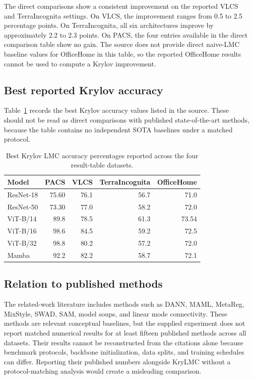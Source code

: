 \documentclass[11pt,a4paper]{article}
\begin{document}
The direct comparisons show a consistent improvement on the reported VLCS and TerraIncognita settings. On VLCS, the improvement ranges from 0.5 to 2.5 percentage points. On TerraIncognita, all six architectures improve by approximately 2.2 to 2.3 points. On PACS, the four entries available in the direct comparison table show no gain. The source does not provide direct naive-LMC baseline values for OfficeHome in this table, so the reported OfficeHome results cannot be used to compute a Krylov improvement.

\subsection{Best reported Krylov accuracy}
Table~\ref{tab:best_accuracy} records the best Krylov accuracy values listed in the source. These should not be read as direct comparisons with published state-of-the-art methods, because the table contains no independent SOTA baselines under a matched protocol.

\begin{table}[H]
\centering
\caption{Best Krylov LMC accuracy percentages reported across the four result-table datasets.}
\label{tab:best_accuracy}
\small
\begin{tabular}{lrrrr}
\toprule
Model & PACS & VLCS & TerraIncognita & OfficeHome \\
\midrule
ResNet-18 & 75.60 & 76.1 & 56.7 & 71.0 \\
ResNet-50 & 73.30 & 77.0 & 58.2 & 72.0 \\
ViT-B/14 & 89.8 & 78.5 & 61.3 & 73.54 \\
ViT-B/16 & 98.6 & 84.5 & 59.2 & 72.5 \\
ViT-B/32 & 98.8 & 80.2 & 57.2 & 72.0 \\
Mamba & 92.2 & 82.2 & 58.7 & 72.1 \\
\bottomrule
\end{tabular}
\end{table}

\subsection{Relation to published methods}
The related-work literature includes methods such as DANN, MAML, MetaReg, MixStyle, SWAD, SAM, model soups, and linear mode connectivity. These methods are relevant conceptual baselines, but the supplied experiment does not report matched numerical results for at least fifteen published methods across all datasets. Their results cannot be reconstructed from the citations alone because benchmark protocols, backbone initialization, data splits, and training schedules can differ. Reporting their published numbers alongside KryLMC without a protocol-matching analysis would create a misleading comparison.
\end{document}
